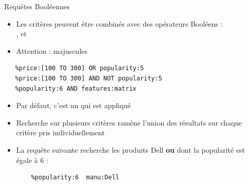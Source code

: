 \begin{frame}[fragile]{Requêtes Booléennes}

  \begin{itemize}
    \item Les critères peuvent être combinés avec des opérateurs Booléens :\\
      ,  et 
    \item Attention : majuscules
  \end{itemize}
\begin{verbatim}
   %price:[100 TO 300] OR popularity:5
   %price:[100 TO 300] AND NOT popularity:5
   %popularity:6 AND features:matrix  
\end{verbatim}
   
\begin{itemize}
  \item Par défaut, c'est un  qui est appliqué
  \item Recherche sur plusieurs critères ramène l'union des résultats sur chaque
    critère pris individuellement
  \item La requête suivante recherche les produits Dell {\bf ou} dont la popularité est
égale à 6 :
\begin{verbatim}
    %popularity:6  manu:Dell
\end{verbatim}

\end{itemize}

\end{frame}

